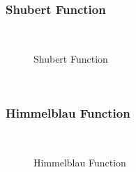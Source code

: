 \subsubsection{Shubert Function}
~
\begin{figure}[ht]
	\centering
	\setlength \fboxsep{0pt}
	\setlength \fboxrule{0.5pt}
	\caption{Shubert Function}
	\label{fig:ShubertGraph}
\end{figure}
~
\subsubsection{Himmelblau Function}
~
\begin{figure}[ht]
	\centering
	\setlength \fboxsep{0pt}
	\setlength \fboxrule{0.5pt}
	\caption{Himmelblau Function}
	\label{fig:HimmelblaueGraph}
\end{figure}
~
